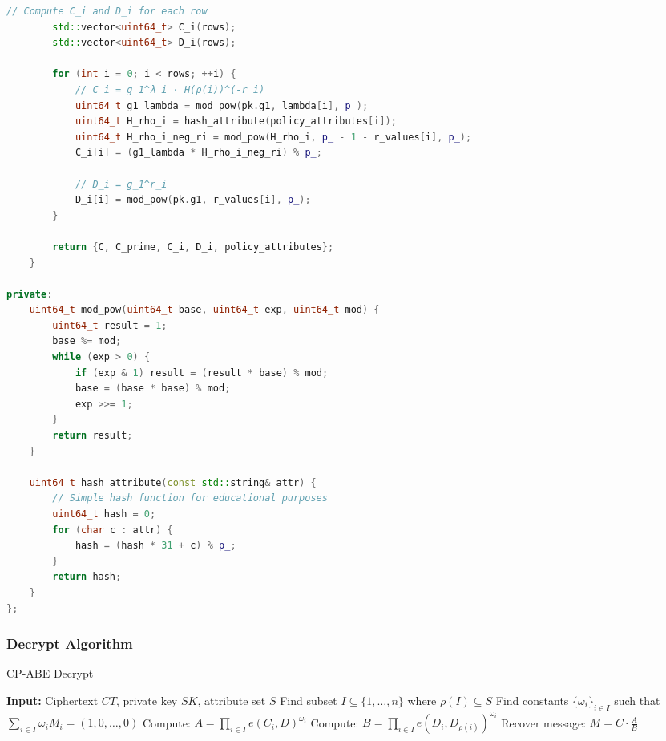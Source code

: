 \documentclass[11pt,a4paper]{article}
\begin{document}
\begin{lstlisting}[language=C++, caption=CP-ABE Encrypt Implementation]
        // Compute C_i and D_i for each row
        std::vector<uint64_t> C_i(rows);
        std::vector<uint64_t> D_i(rows);
        
        for (int i = 0; i < rows; ++i) {
            // C_i = g_1^λ_i · H(ρ(i))^(-r_i)
            uint64_t g1_lambda = mod_pow(pk.g1, lambda[i], p_);
            uint64_t H_rho_i = hash_attribute(policy_attributes[i]);
            uint64_t H_rho_i_neg_ri = mod_pow(H_rho_i, p_ - 1 - r_values[i], p_);
            C_i[i] = (g1_lambda * H_rho_i_neg_ri) % p_;
            
            // D_i = g_1^r_i
            D_i[i] = mod_pow(pk.g1, r_values[i], p_);
        }
        
        return {C, C_prime, C_i, D_i, policy_attributes};
    }
    
private:
    uint64_t mod_pow(uint64_t base, uint64_t exp, uint64_t mod) {
        uint64_t result = 1;
        base %= mod;
        while (exp > 0) {
            if (exp & 1) result = (result * base) % mod;
            base = (base * base) % mod;
            exp >>= 1;
        }
        return result;
    }
    
    uint64_t hash_attribute(const std::string& attr) {
        // Simple hash function for educational purposes
        uint64_t hash = 0;
        for (char c : attr) {
            hash = (hash * 31 + c) % p_;
        }
        return hash;
    }
};
\end{lstlisting}

\subsubsection{Decrypt Algorithm}

\begin{algorithm}
\caption{CP-ABE Decrypt}
\begin{algorithmic}
\STATE \textbf{Input:} Ciphertext $CT$, private key $SK$, attribute set $S$
\STATE Find subset $I \subseteq \{1, \ldots, n\}$ where $\rho(I) \subseteq S$
\STATE Find constants $\{\omega_i\}_{i \in I}$ such that $\sum_{i \in I} \omega_i M_i = (1, 0, \ldots, 0)$
\STATE Compute: $A = \prod_{i \in I} e(C_i, D)^{\omega_i}$
\STATE Compute: $B = \prod_{i \in I} e(D_i, D_{\rho(i)})^{\omega_i}$
\STATE Recover message: $M = C \cdot \frac{A}{B}$
\end{algorithmic}
\end{algorithm}
\end{document}

